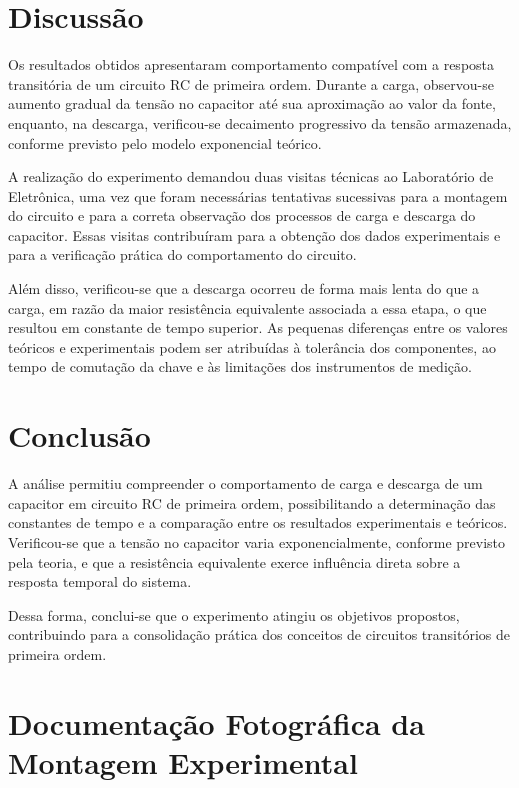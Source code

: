 \documentclass[12pt,a4paper]{article}
\begin{document}
\newpage
\section{Discussão}

Os resultados obtidos apresentaram comportamento compatível com a resposta transitória de um circuito RC de primeira ordem. Durante a carga, observou-se aumento gradual da tensão no capacitor até sua aproximação ao valor da fonte, enquanto, na descarga, verificou-se decaimento progressivo da tensão armazenada, conforme previsto pelo modelo exponencial teórico.

A realização do experimento demandou duas visitas técnicas ao Laboratório de Eletrônica, uma vez que foram necessárias tentativas sucessivas para a montagem do circuito e para a correta observação dos processos de carga e descarga do capacitor. Essas visitas contribuíram para a obtenção dos dados experimentais e para a verificação prática do comportamento do circuito.

Além disso, verificou-se que a descarga ocorreu de forma mais lenta do que a carga, em razão da maior resistência equivalente associada a essa etapa, o que resultou em constante de tempo superior. As pequenas diferenças entre os valores teóricos e experimentais podem ser atribuídas à tolerância dos componentes, ao tempo de comutação da chave e às limitações dos instrumentos de medição.

\section{Conclusão}

A análise permitiu compreender o comportamento de carga e descarga de um capacitor em circuito RC de primeira ordem, possibilitando a determinação das constantes de tempo e a comparação entre os resultados experimentais e teóricos. Verificou-se que a tensão no capacitor varia exponencialmente, conforme previsto pela teoria, e que a resistência equivalente exerce influência direta sobre a resposta temporal do sistema.

Dessa forma, conclui-se que o experimento atingiu os objetivos propostos, contribuindo para a consolidação prática dos conceitos de circuitos transitórios de primeira ordem.

\newpage
\section{Documentação Fotográfica da Montagem Experimental}
\end{document}
